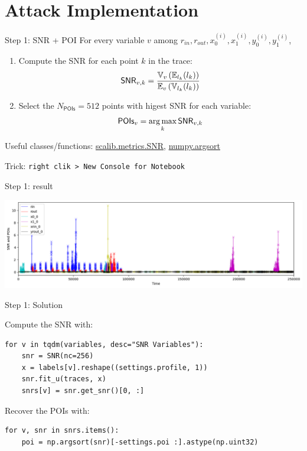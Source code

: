 \documentclass[aspectratio=169]{beamer}
\begin{document}
\section{Attack Implementation}
\begin{frame}{Step 1: SNR + POI}
    For every variable $v$ among $r_{in}, r_{out}, x^{(i)}_0, x^{(i)}_1, y^{(i)}_0, y^{(i)}_1$,
    \begin{enumerate}
        \item Compute the SNR for each point $k$ in the trace:
            \[
                \textsf{SNR}_{v,k} = \frac{
                    \operatorname*{\mathbb{V}}_{v}\left(\operatorname*{\mathbb{E}}_{l_k}(l_k)\right)
                }{
                    \operatorname*{\mathbb{E}}_{v}\left(\operatorname*{\mathbb{V}}_{l_k}(l_k)\right)
                }
            \]
        \item Select the $N_{\textsf{POIs}}=512$ points with higest SNR for each variable:
            \[
                \textsf{POIs}_{v} = \operatorname*{\arg\max}_k \textsf{SNR}_{v,k}
            \]
    \end{enumerate}

    Useful classes/functions:
    \href{https://scalib.readthedocs.io/en/stable/source/api/scalib.metrics.SNR.html}{scalib.metrics.SNR},
    \href{https://numpy.org/doc/stable/reference/generated/numpy.argsort.html}{numpy.argsort}

    \bigskip

    Trick: \texttt{right clik > New Console for Notebook}
\end{frame}
\begin{frame}{Step 1: result}
    \begin{center}
        \includegraphics[width=\textwidth]{figures/res_step1.png}
    \end{center}
\end{frame}

\begin{frame}[containsverbatim]{Step 1: Solution}

Compute the SNR with:
\begin{verbatim}
for v in tqdm(variables, desc="SNR Variables"):
    snr = SNR(nc=256)
    x = labels[v].reshape((settings.profile, 1))
    snr.fit_u(traces, x)
    snrs[v] = snr.get_snr()[0, :]
\end{verbatim}

Recover the POIs with:
\begin{verbatim}
for v, snr in snrs.items():
    poi = np.argsort(snr)[-settings.poi :].astype(np.uint32)
\end{verbatim}
\end{frame}
\end{document}
